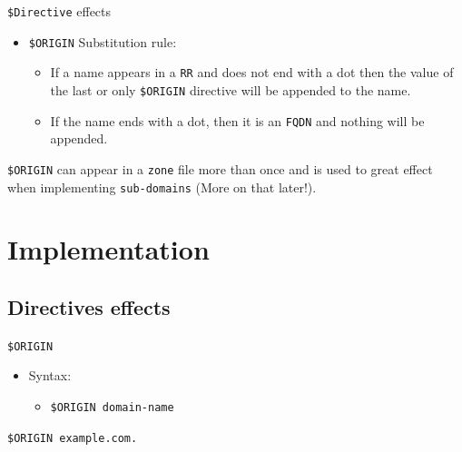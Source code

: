 \documentclass[xcolor=table]{beamer}
\begin{document}
\begin{frame}{\texttt{\$Directive} effects}
  \begin{itemize}
    \item \texttt{\$ORIGIN} Substitution rule:
      \begin{itemize}
        \item If a name appears in a \texttt{RR} and does not end with a dot then the value of the last or only \texttt{\$ORIGIN} directive will be appended to the name.
        \item If the name ends with a dot, then it is an \texttt{FQDN} and nothing will be appended.
      \end{itemize}
  \end{itemize}
  \begin{tcolorbox}[title={\textbf{NOTE:}}]
    \texttt{\$ORIGIN} can appear in a \texttt{zone} file more than once and is used to great effect when implementing \texttt{sub-domains} (More on that later!).
  \end{tcolorbox}
\end{frame}

\section{Implementation}
\subsection{Directives effects}
\begin{frame}{\texttt{\$ORIGIN}}
  \begin{itemize}
    \item Syntax:
      \begin{itemize}
        \item \texttt{\$ORIGIN domain-name}
      \end{itemize}
  \end{itemize}
  \begin{tcolorbox}
    \begin{center}
      \texttt{\$ORIGIN example.com.}      
    \end{center}
  \end{tcolorbox}
\end{frame}
\end{document}
